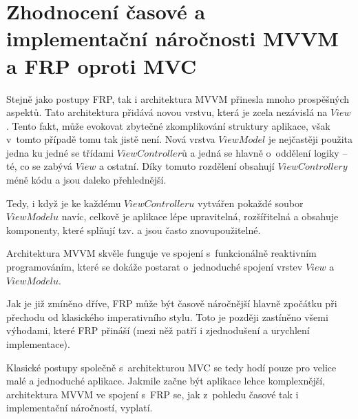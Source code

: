 \documentclass[thesis=M,czech]{FITthesis}[2012/06/26]
\begin{document}
\section{Zhodnocení časové a implementační náročnosti MVVM a FRP oproti MVC}
Stejně jako postupy FRP, tak i architektura MVVM přinesla mnoho prospěšných aspektů. Tato architektura přidává novou vrstvu, která je zcela nezávislá na $View$. Tento fakt, může evokovat zbytečné zkomplikování struktury aplikace, však v~tomto případě tomu tak jistě není. Nová vrstva $ViewModel$ je nejčastěji použita jedna ku jedné se třídami $ViewControllerů$ a jedná se hlavně o~oddělení logiky -- té, co se zabývá $View$ a ostatní. Díky tomuto rozdělení obsahují $ViewControllery$ méně kódu a jsou daleko přehlednější.

Tedy, i když je ke každému $ViewControlleru$ vytvářen pokaždé soubor $ViewModelu$ navíc, celkově je aplikace lépe upravitelná, rozšířitelná a obsahuje komponenty, které splňují tzv.  a jsou často znovupoužitelné.

Architektura MVVM skvěle funguje ve spojení s~funkcionálně reaktivním programováním, které se dokáže postarat o~jednoduché spojení vrstev $View$ a $ViewModelu$.

Jak je již zmíněno dříve, FRP může být časově náročnější hlavně zpočátku při přechodu od klasického imperativního stylu. Toto je později zastíněno všemi výhodami, které FRP přináší (mezi něž patří i zjednodušení a urychlení implementace).

Klasické postupy společně s~architekturou MVC se tedy hodí pouze pro velice malé a jednoduché aplikace. Jakmile začne být aplikace lehce komplexnější, architektura MVVM ve spojení s~FRP se, jak z~pohledu časové tak i implementační náročností, vyplatí.
\end{document}
